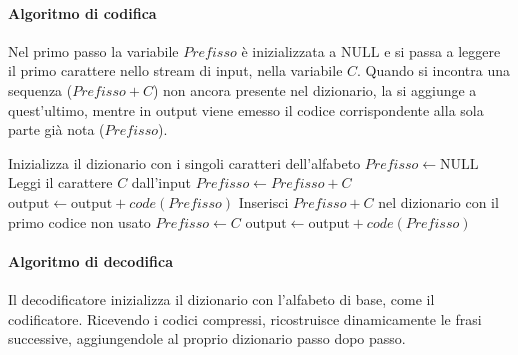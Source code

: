 \paragraph{Algoritmo di codifica}
Nel primo passo la variabile $\mathit{Prefisso}$ è inizializzata a $\text{NULL}$ e si passa a leggere il primo carattere nello stream di input, nella variabile $C$. Quando si incontra una sequenza ($\mathit{Prefisso} + C$) non ancora presente nel dizionario, la si aggiunge a quest'ultimo, mentre in output viene emesso il codice corrispondente alla sola parte già nota ($\mathit{Prefisso}$).

\begin{algorithm}[htbp]
\caption{Algoritmo di codifica LZW}
\begin{algorithmic}[1]
\State Inizializza il dizionario con i singoli caratteri dell'alfabeto
\State $\mathit{Prefisso} \gets \text{NULL}$
    \State Leggi il carattere $C$ dall'input
        \State $\mathit{Prefisso} \gets \mathit{Prefisso} + C$
    \Else
        \State $\text{output} \gets \text{output} + code(\mathit{Prefisso})$
        \State Inserisci $\mathit{Prefisso} + C$ nel dizionario con il primo codice non usato
        \State $\mathit{Prefisso} \gets C$
    \EndIf
\EndWhile
\State $\text{output} \gets \text{output} + code(\mathit{Prefisso})$
\end{algorithmic}
\end{algorithm}












\paragraph{Algoritmo di decodifica}
Il decodificatore inizializza il dizionario con l'alfabeto di base, come il codificatore. Ricevendo i codici compressi, ricostruisce dinamicamente le frasi successive, aggiungendole al proprio dizionario passo dopo passo.

